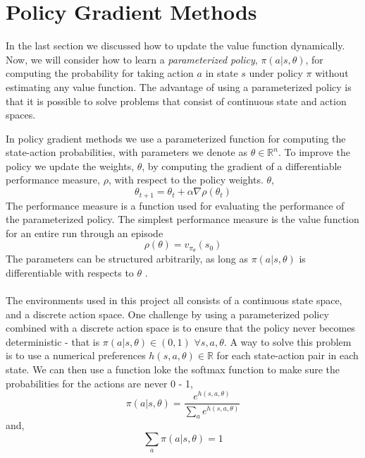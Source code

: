 \documentclass[11pt]{article}
\begin{document}
\section{Policy Gradient Methods}

In the last section we discussed how to update the value function dynamically. Now, we will consider how to learn a \textit{parameterized policy}, $\pi (a | s, \theta)$, for computing the probability for taking action $a$ in state $s$ under policy $\pi$ without estimating any value function. The advantage of using a parameterized policy is that it is possible to solve problems that consist of continuous state and action spaces\cite{policyGrad}.

In policy gradient methods we use a
parameterized function for computing the state-action probabilities, with parameters we denote as $\theta \in \mathbb{R}^{n}$. To improve the policy we update the weights, $\theta$, by computing the gradient of a differentiable performance measure, $\rho$, with respect to the policy weights. $\theta$, 
\begin{equation}
    \theta_{t + 1} = \theta_{t} + \alpha \nabla \rho (\theta_{t})
\end{equation}
The performance measure is a function used for evaluating the performance of the parameterized policy.
The simplest performance measure is the value function for an entire run through an episode
\begin{equation}
    \rho (\theta) = v_{\pi_{\theta}}(s_{0})
\end{equation}
The parameters can be structured arbitrarily, as long as $\pi(a | s, \theta)$ is differentiable with respects to $\theta$ \cite{RLbook}.
\\ \\
The environments used in this project all consists of a continuous state space, and a discrete action space.
One challenge by using a parameterized policy combined with a discrete action space is to ensure that the policy never becomes deterministic - that is $\pi (a|s,\theta) \in (0,1)$ $\forall s, a, \theta$.
A way to solve this problem is to use a numerical preferences $h(s, a, \theta) \in \mathbb{R}$ for each state-action pair in each state. 
We can then use a function loke the softmax function to make sure the probabilities for the actions are never 0 - 1,
\begin{equation}
    \pi(a | s, \theta) = \frac{e^{h(s,a,\theta)}}{\sum_{a} e^{h(s,a,\theta)}}
\end{equation}
and,
\begin{equation}
    \sum_{a} \pi (a | s, \theta) = 1
\end{equation}
\end{document}

